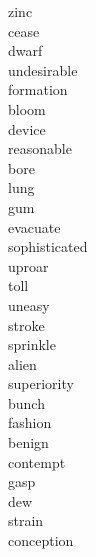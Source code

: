 \documentclass[a4paper, 11pt]{ctexart}
\begin{document}
\begin{multicols*}{3}
\begin{description}
\item[zinc]

\item[cease]

\item[dwarf]

\item[undesirable]

\item[formation]

\item[bloom]

\item[device]

\item[reasonable]

\item[bore]

\item[lung]

\item[gum]

\item[evacuate]

\item[sophisticated]

\item[uproar]

\item[toll]

\item[uneasy]

\item[stroke]

\item[sprinkle]

\item[alien]

\item[superiority]

\item[bunch]

\item[fashion]

\item[benign]

\item[contempt]

\item[gasp]

\item[dew]

\item[strain]

\item[conception]


\end{description}
\end{multicols*}
\end{document}

